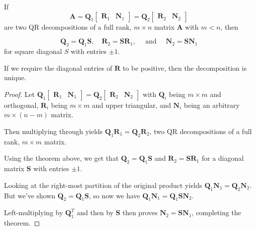 \begin{theorem}[$m<n $矩阵$A$进行QR分解的唯一性]
    
    If $$\boldsymbol{A}=\boldsymbol{Q}_{1}\left[\begin{array}{ll}\boldsymbol{R}_{1} & \boldsymbol{N}_{1}\end{array}\right]=\boldsymbol{Q}_{2}\left[\begin{array}{ll}\boldsymbol{R}_{2} & \boldsymbol{N}_{2}\end{array}\right]$$ are two QR decompositions of a full rank, $m \times n$ matrix $\boldsymbol{A}$ with $m<n$, then

    
$$
\boldsymbol{Q}_{2}=\boldsymbol{Q}_{1} \boldsymbol{S}, \quad \boldsymbol{R}_{2}=\boldsymbol{S R}_{1}, \quad \text { and } \quad \boldsymbol{N}_{2}=\boldsymbol{S} \boldsymbol{N}_{1}
$$
for square diagonal $S$ with entries $\pm 1$. 

If we require the diagonal entries of $\boldsymbol{R}$ to be positive, then the decomposition is unique.

\end{theorem}

\begin{proof}
    Let $\boldsymbol{Q}_{1}\left[\begin{array}{ll}\boldsymbol{R}_{1} & \boldsymbol{N}_{1}\end{array}\right]=\boldsymbol{Q}_{2}\left[\begin{array}{ll}\boldsymbol{R}_{2} & \boldsymbol{N}_{2}\end{array}\right]$ with $\boldsymbol{Q}_{i}$ being $m \times m$ and orthogonal, $\boldsymbol{R}_{i}$ being $m \times m$ and upper triangular, and $\boldsymbol{N}_{i}$ being an arbitrary $m \times(n-m)$ matrix. 
    
    Then multiplying through yields $\boldsymbol{Q}_{1} \boldsymbol{R}_{1}=\boldsymbol{Q}_{2} \boldsymbol{R}_{2}$, two $\mathrm{QR}$ decompositions of a full rank, $m \times m$ matrix. 
    
    Using the theorem above, we get that $\boldsymbol{Q}_{2}=\boldsymbol{Q}_{1} \boldsymbol{S}$ and $\boldsymbol{R}_{2}=\boldsymbol{S} \boldsymbol{R}_{1}$ for a diagonal matrix $\boldsymbol{S}$ with entries $\pm 1$. 
    
    Looking at the right-most partition of the original product yields $\boldsymbol{Q}_{1} \boldsymbol{N}_{1}=\boldsymbol{Q}_{2} \boldsymbol{N}_{2}$. But we've shown $\boldsymbol{Q}_{2}=\boldsymbol{Q}_{1} \boldsymbol{S}$, so now we have $\boldsymbol{Q}_{1} \boldsymbol{N}_{1}=\boldsymbol{Q}_{1} \boldsymbol{S} \boldsymbol{N}_{2}$. 
    
    Left-multiplying by $\boldsymbol{Q}_{1}^{T}$ and then by $\boldsymbol{S}$ then proves $\boldsymbol{N}_{2}=\boldsymbol{S} \boldsymbol{N}_{1}$, completing the theorem.
\end{proof}

